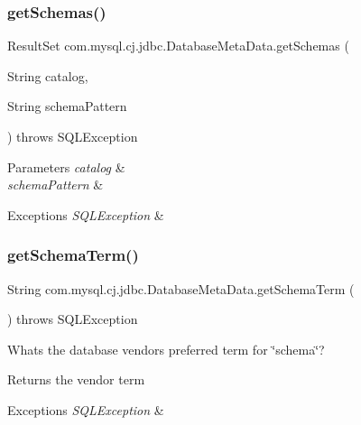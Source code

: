 \subsubsection{\texorpdfstring{get\+Schemas()}{getSchemas()}}
{\footnotesize\ttfamily Result\+Set com.\+mysql.\+cj.\+jdbc.\+Database\+Meta\+Data.\+get\+Schemas (\begin{DoxyParamCaption}\item[{String}]{catalog,  }\item[{String}]{schema\+Pattern }\end{DoxyParamCaption}) throws S\+Q\+L\+Exception}


\begin{DoxyParams}{Parameters}
{\em catalog} & \\
\hline
{\em schema\+Pattern} & \\
\hline
\end{DoxyParams}

\begin{DoxyExceptions}{Exceptions}
{\em S\+Q\+L\+Exception} & \\
\hline
\end{DoxyExceptions}
\mbox{\label{classcom_1_1mysql_1_1cj_1_1jdbc_1_1_database_meta_data_a694df26784a27fb9bf57e3b94e16878b}} 
\subsubsection{\texorpdfstring{get\+Schema\+Term()}{getSchemaTerm()}}
{\footnotesize\ttfamily String com.\+mysql.\+cj.\+jdbc.\+Database\+Meta\+Data.\+get\+Schema\+Term (\begin{DoxyParamCaption}{ }\end{DoxyParamCaption}) throws S\+Q\+L\+Exception}

What\textquotesingle{}s the database vendor\textquotesingle{}s preferred term for \char`\"{}schema\char`\"{}?

\begin{DoxyReturn}{Returns}
the vendor term 
\end{DoxyReturn}

\begin{DoxyExceptions}{Exceptions}
{\em S\+Q\+L\+Exception} & \\
\hline
\end{DoxyExceptions}
\mbox{\label{classcom_1_1mysql_1_1cj_1_1jdbc_1_1_database_meta_data_ae340a42fa7071bbc701cb74bec470c7b}} 
